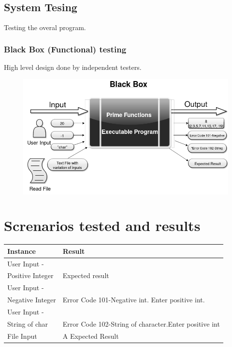 \documentclass[11 pt]{article}
\begin{document}
\subsection{System Tesing}
Testing the overal program.
\subsubsection{Black Box (Functional) testing}
High level design done by independent testers.\\

    \begin{figure}[h]
    \centering
    
    \includegraphics[width=\linewidth]{Black Box Diagram.png}
    \end{figure}
 
\section{Screnarios tested and results}
\begin{tabular}{|p{3cm}|p{9cm}|}
\hline
\textbf{Instance} & \textbf{Result}\\
\hline
User Input -\\ Positive Integer  &  Expected result\\
\hline
User Input -\\Negative Integer &  Error Code 101-Negative int. Enter positive int.\\
\hline
User Input -\\String of char & Error Code 102-String of character.Enter positive int\\
\hline
File Input & A Expected Result\\
\hline

    
\end{tabular}

 
\end{document}
